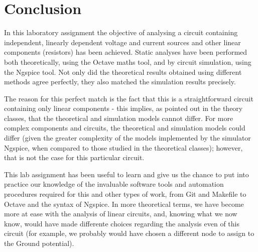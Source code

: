 \section{Conclusion}
\label{sec:conclusion}

In this laboratory assignment the objective of analysing a circuit containing independent, linearly dependent voltage and current sources and other linear components (resistors) has been
achieved. Static analyses have been performed both
theoretically, using the Octave maths tool, and by circuit simulation, using the
Ngspice tool. Not only did the theoretical results obtained using different methods agree perfectly, they also matched the simulation results precisely.\par
The reason for this perfect match is the fact that this is a
straightforward circuit containing only linear components - this implies, as pointed out in the theory classes, that the theoretical
and simulation models cannot differ. For more complex components and circuits, the
theoretical and simulation models could differ (given the greater complexity of the models implemented by the simulator Ngspice, when compared to those studied in the theoretical classes); however, that is not the case for this particular circuit.\par
This lab assignment has been useful to learn and give us the chance to put into practice our knowledge of the invaluable software tools and automation procedures required for this and other types of work, from Git and Makefile to Octave and the syntax of Ngspice. In more theoretical terms, we have become more at ease with the analysis of linear circuits, and, knowing what we now know, would have made differente choices regarding the analysis even of this circuit (for example, we probably would have chosen a different node to assign to the Ground potential).

